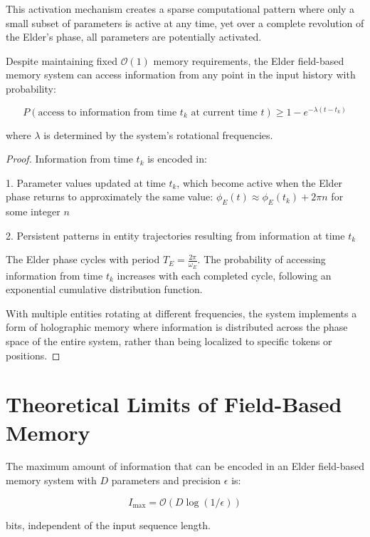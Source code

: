 This activation mechanism creates a sparse computational pattern where only a small subset of parameters is active at any time, yet over a complete revolution of the Elder's phase, all parameters are potentially activated.

\begin{theorem}
Despite maintaining fixed $\mathcal{O}(1)$ memory requirements, the Elder field-based memory system can access information from any point in the input history with probability:

\begin{equation}
P(\text{access to information from time } t_k \text{ at current time } t) \geq 1 - e^{-\lambda (t-t_k)}
\end{equation}

where $\lambda$ is determined by the system's rotational frequencies.
\end{theorem}

\begin{proof}
Information from time $t_k$ is encoded in:

1. Parameter values updated at time $t_k$, which become active when the Elder phase returns to approximately the same value: $\phi_E(t) \approx \phi_E(t_k) + 2\pi n$ for some integer $n$

2. Persistent patterns in entity trajectories resulting from information at time $t_k$

The Elder phase cycles with period $T_E = \frac{2\pi}{\omega_E}$. The probability of accessing information from time $t_k$ increases with each completed cycle, following an exponential cumulative distribution function.

With multiple entities rotating at different frequencies, the system implements a form of holographic memory where information is distributed across the phase space of the entire system, rather than being localized to specific tokens or positions.
\end{proof}

\section{Theoretical Limits of Field-Based Memory}

\begin{theorem}
The maximum amount of information that can be encoded in an Elder field-based memory system with $D$ parameters and precision $\epsilon$ is:

\begin{equation}
I_{\max} = \mathcal{O}(D \log(1/\epsilon))
\end{equation}

bits, independent of the input sequence length.
\end{theorem}

